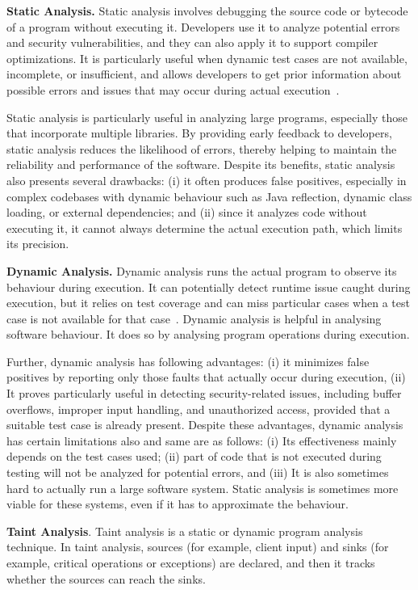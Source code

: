 \textbf{Static Analysis.} Static analysis involves debugging the source code or bytecode
of a program without executing it. Developers use it to analyze potential errors and
security vulnerabilities, and they can also apply it to support compiler optimizations.
It is particularly useful when dynamic test cases are not available,
incomplete, or insufficient, and allows developers to get prior information about possible
errors and issues that may occur during actual execution~\cite{Rahaman2023}.

Static analysis is particularly useful in analyzing large programs, especially those that
incorporate multiple libraries. By providing early feedback to developers,
static analysis reduces the likelihood of errors, thereby helping to maintain the reliability
and performance of the software. Despite its benefits, static analysis also presents several
drawbacks: (i) it often produces false positives, especially in complex codebases with dynamic
behaviour such as Java reflection, dynamic class loading, or external dependencies; and (ii)
since it analyzes code without executing it, it cannot always determine the actual execution
path, which limits its precision.

\textbf{Dynamic Analysis.} Dynamic analysis runs the actual program to observe its
behaviour during execution. It can potentially detect runtime issue caught
during execution, but it relies on test coverage and can miss particular cases when a test
case is not available for that case~\cite{Kuliamin2024}. Dynamic analysis is helpful in analysing software
behaviour. It does so by analysing program operations during execution.

Further, dynamic analysis has following advantages: (i) it minimizes false positives by reporting only those faults that actually
occur during execution, (ii) It proves particularly useful in detecting security-related issues,
including buffer overflows, improper input handling, and unauthorized access, provided that a
suitable test case is already present. Despite these advantages, dynamic analysis has certain limitations
also and same are as follows: (i) Its effectiveness mainly depends on the test cases used;
(ii) part of code that is not executed during testing will not be analyzed for potential
errors, and (iii) It is also sometimes hard to actually run a large software system. Static
analysis is sometimes more viable for these systems, even if it has to approximate the behaviour.

\textbf{Taint Analysis}. Taint analysis is a static or dynamic program analysis technique.
In taint analysis, sources (for example, client input) and sinks (for example, critical
operations or exceptions) are declared, and then it tracks whether the sources can reach the sinks.

